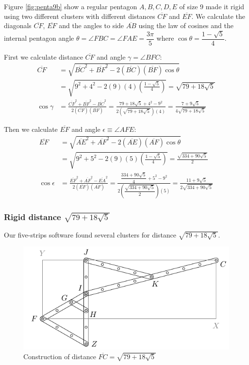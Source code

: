 \documentclass[11pt]{article}
\begin{document}
Figure \ref{fig:penta9b} show a regular pentagon $A,B,C,D,E$ of size $9$ made it rigid using two different clusters with different distances $\overline{CF}$ and $\overline{EF}$. We calculate the diagonals $\overline{CF}$, $\overline{EF}$ and the angles to side $\overline{AB}$ using the law of cosines and the internal pentagon angle $\theta=\angle{FBC}=\angle{FAE}=\dfrac{3\pi}5$ where $\cos\theta = \dfrac{1-\sqrt5}4$. 

First we calculate distance $\overline{CF}$ and angle $\gamma = \angle{BFC}$:
\begin{align}
\overline{CF} &= \sqrt{
 \overline{BC}^2 + \overline{BF}^2 - 2(\overline{BC})(\overline{BF})\cos\theta } \nonumber\\
 &= \sqrt{9^2 + 4^2 - 2(9)(4)\left(\frac{1-\sqrt5}4\right)} = \sqrt{79 + 18\sqrt5}\\
%
\cos\gamma &= 
 \frac{\overline{CF}^2 + \overline{BF}^2 - \overline{BC}^2}{2(\overline{CF})(\overline{BF})}
 = \frac{79 + 18\sqrt5 + 4^2 - 9^2}{2(\sqrt{79 + 18\sqrt5})(4)}
 = \frac{7 + 9\sqrt5}{4\sqrt{79 + 18\sqrt5}}
\end{align}

Then we calculate $\overline{EF}$ and angle $\epsilon \equiv \angle{AFE}$:
\begin{align}
\overline{EF} &= \sqrt{
 \overline{AE}^2 + \overline{AF}^2 - 2(\overline{AE})(\overline{AF})\cos\theta} \nonumber\\
 &= \sqrt{9^2 + 5^2 - 2(9)(5)\left(\frac{1-\sqrt5}4\right)} = \frac{\sqrt{334 + 90\sqrt5}}2\\
%
\cos\epsilon &=
 \frac{\overline{EF}^2 + \overline{AF}^2 - \overline{EA}^2}{2(\overline{EF})(\overline{AF})}
 = \frac{\dfrac{334 + 90\sqrt5}4 + 5^2 - 9^2 }{2\left(\dfrac{\sqrt{334 + 90\sqrt5}}2\right)(5)}
 = \frac{11 + 9\sqrt5}{2\sqrt{334 + 90\sqrt5}}
\end{align}

\subsubsection{Rigid distance $\sqrt{79 + 18\sqrt5}$}

Our five-strips software found several clusters for distance $\sqrt{79 + 18\sqrt5}$.

\begin{figure}[H]
\centering
\includegraphics[scale=1]{9/cluster9b1}
\caption{Construction of distance $\overline{FC}=\sqrt{79 + 18\sqrt5}$}
\label{fig:cluster9b1}
\end{figure}
\end{document}
